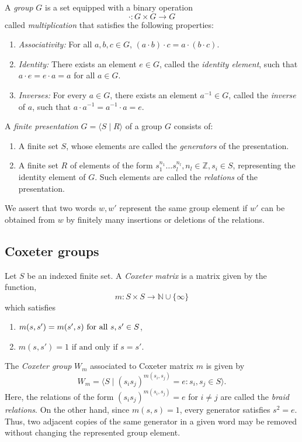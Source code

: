 \documentclass{article}
\begin{document}
A {\em group} $G$ is a set equipped with a binary operation \[\cdot: G \times G \rightarrow G\] called {\em multiplication} that satisfies the following properties:
\begin{enumerate}
        \item \emph{Associativity:} For all $a,b,c\in G$, $(a\cdot b)\cdot c=a\cdot(b\cdot c)$.
        \item \emph{Identity:} There exists an element $e\in G$, called the \emph{identity element}, such that $a\cdot e=e\cdot a=a$ for all $a\in G$.
        \item \emph{Inverses:} For every $a\in G$, there exists an element $a^{-1}\in G$, called the \emph{inverse} of $a$, such that $a\cdot a^{-1}=a^{-1}\cdot a=e.$
\end{enumerate}
A \emph{finite presentation} $G=\langle S\mid R\rangle$ of a group $G$ consists of: 
\begin{enumerate} 
\item A finite set $S$, whose elements are called the \emph{generators} of the presentation. 
\item A finite set $R$ of elements of the form $s_1^{n_1}\ldots s_l^{n_l}, n_l\in \mathbb{Z}, s_i\in S$, representing the identity element of $G$. Such elements are called the \emph{relations} of the presentation. 
\end{enumerate}
We assert that two words $w,w'$ represent the same group element if $w'$ can be obtained from $w$ by finitely many insertions or deletions of the relations.
\subsection{Coxeter groups} 

Let $S$ be an indexed finite set. A {\em Coxeter matrix} is a matrix given by the function,
\[
    m:S \times S \longrightarrow \mathbb{N} \cup \{\infty\}
\]
which satisfies
\begin{enumerate}
    \item $m(s,s') = m(s',s)  \textup{ for all } s,s' \in S$,
    \item $m(s,s') = 1 \text{ if and only if } s=s'$.
\end{enumerate}

The {\em Coxeter group} $W_m$ associated to Coxeter matrix $m$ is given by
$$
W_m = \langle S \mid (s_i s_j)^{m(s_i,s_j)}=e : s_i,s_j \in S \rangle.
$$
Here, the relations of the form $(s_i s_j)^{m(s_i,s_j)}=e$ for $i\neq j$ are called the \textit{braid relations}. On the other hand, since $m(s,s)=1$, every generator satisfies $s^2=e.$ Thus, two adjacent copies of the same generator in a given word may be removed without changing the represented group element.
\end{document}
